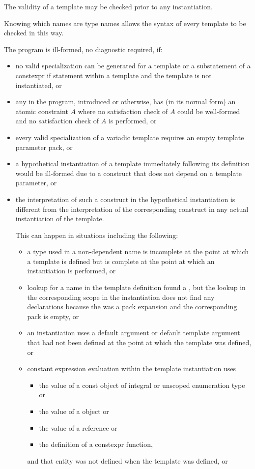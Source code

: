 \pnum
{}%
%
The validity of a template may be checked prior to any instantiation.
\begin{note}
Knowing which names are type names allows the syntax of every template
to be checked in this way.
\end{note}
The program is ill-formed, no diagnostic required, if:
\begin{itemize}
\item
no valid specialization can be generated for a template
or a substatement of a constexpr if statement within a template
and the template is not instantiated, or
\item
any  in the program, introduced or otherwise,
has (in its normal form) an atomic constraint $A$ where
no satisfaction check of $A$ could be well-formed and
no satisfaction check of $A$ is performed, or
\item
every valid specialization of a variadic template requires an empty template
parameter pack, or
\item
a hypothetical instantiation of a template
immediately following its definition
would be ill-formed
due to a construct that does not depend on a template parameter, or
\item
the interpretation of such a construct
in the hypothetical instantiation
is different from
the interpretation of the corresponding construct
in any actual instantiation of the template.
\begin{note}
This can happen in situations including the following:
\begin{itemize}
\item a type used in a non-dependent name is incomplete at the point at which a
template is defined but is complete at the point at which an instantiation is
performed, or

\item lookup for a name in the template definition found a ,
but the lookup in the corresponding scope in the instantiation
does not find any declarations because the 
was a pack expansion and the corresponding pack is empty, or

\item an instantiation uses a default argument or default template argument
that had not been defined at the point at which the template was defined, or

\item constant expression evaluation within the template
instantiation uses
  \begin{itemize}
  \item the value of a const object of integral or unscoped enumeration type or
  \item the value of a  object or
  \item the value of a reference or
  \item the definition of a constexpr function,
  \end{itemize}
and that entity was not defined when the template was defined, or


\end{itemize}
\end{note}
\end{itemize}
